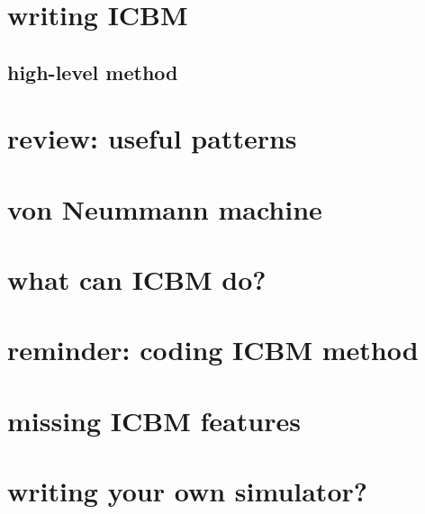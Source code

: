 \section{writing ICBM}

\subsection{high-level method}



%

\section{review: useful patterns}




\section{von Neummann machine}



\section{what can ICBM do?}




\section{reminder: coding ICBM method}






\section{missing ICBM features}



\section{writing your own simulator?}



